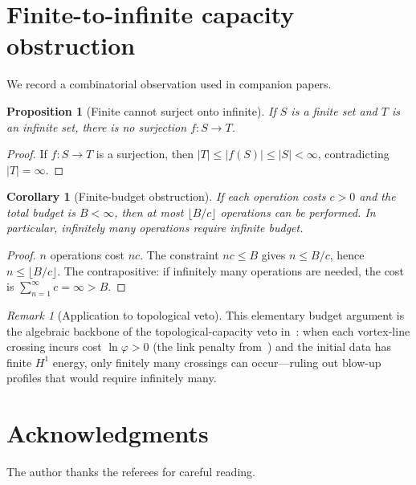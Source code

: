 \documentclass[11pt]{amsart}
\newtheorem{proposition}[theorem]{Proposition}
\newtheorem{corollary}[theorem]{Corollary}
\theoremstyle{definition}
\theoremstyle{remark}
\newtheorem{remark}[theorem]{Remark}
\begin{document}
\section{Finite-to-infinite capacity obstruction}\label{sec:fredholm}

We record a combinatorial observation used in companion papers.

\begin{proposition}[Finite cannot surject onto infinite]\label{prop:finite-surj}
If $S$ is a finite set and $T$ is an infinite set, there is no
surjection $f:S\to T$.
\end{proposition}
\begin{proof}
If $f:S\to T$ is a surjection, then $|T|\le|f(S)|\le|S|<\infty$,
contradicting $|T|=\infty$.
\end{proof}

\begin{corollary}[Finite-budget obstruction]\label{cor:budget}
If each operation costs $c>0$ and the total budget is $B<\infty$,
then at most $\lfloor B/c\rfloor$ operations can be performed.
In particular, infinitely many operations require infinite budget.
\end{corollary}
\begin{proof}
$n$ operations cost $nc$.  The constraint $nc\le B$ gives
$n\le B/c$, hence $n\le\lfloor B/c\rfloor$.
The contrapositive: if infinitely many operations are needed,
the cost is $\sum_{n=1}^\infty c=\infty>B$.
\end{proof}

\begin{remark}[Application to topological veto]
This elementary budget argument is the algebraic backbone of the
topological-capacity veto in~\cite{F6}: when each vortex-line crossing
incurs cost $\ln\varphi>0$ (the link penalty from~\cite{F1}) and the
initial data has finite $H^1$ energy, only finitely many crossings can
occur---ruling out blow-up profiles that would require infinitely many.
\end{remark}

\section*{Acknowledgments}
The author thanks the referees for careful reading.
\end{document}
